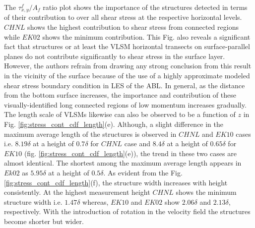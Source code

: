 \documentclass{svjour3}                     %
\begin{document}
The $\tau_{x,y}^f/A_f$ ratio plot shows the importance of the structures detected in terms of their contribution to over all shear stress at the respective horizontal levels.  $CHNL$  shows the highest  contribution to shear stress from  connected regions  while $EK02$ shows  the minimum contribution.  This Fig. also reveals a significant fact that structures or at least the VLSM horizontal transects on surface-parallel planes  do not contribute significantly to shear stress in the surface layer.  However, the authors refrain from drawing any strong conclusion from this result in the vicinity of the surface because of the use of a highly approximate modeled shear stress boundary condition in LES of the ABL.  In general, as the distance from the bottom surface increases, the importance and contribution of these visually-identified long connected regions of low momentum increases gradually. The length scale of VLSMs likewise can also be observed to be a function of $z$ in Fig. \ref{fig:stress_cont_cdf_length}(e). Although, a slight difference in the maximum average  length of the structures is observed in $CHNL$ and $EK10$ cases i.e. $8.19\delta$ at a height of $0.7\delta$ for $CHNL$ case and $8.4\delta$ at a height of $0.65\delta$ for $EK10$ (fig. \ref{fig:stress_cont_cdf_length}(e)), the trend in these two cases are almost identical. The shortest among the maximum average length appears in $Ek02$  as $5.95\delta$ at a height of $0.5\delta$.  As evident from the Fig. \ref{fig:stress_cont_cdf_length}(f), the structure width increases with height consistently.  At the highest measurement height $CHNL$  shows the minimum structure width i.e. $1.47\delta$ whereas, $EK10$ and $EK02$  show $2.06\delta$ and $2.13\delta$, respectively. With the introduction of rotation in the velocity field the structures become shorter but wider. 
\end{document}
